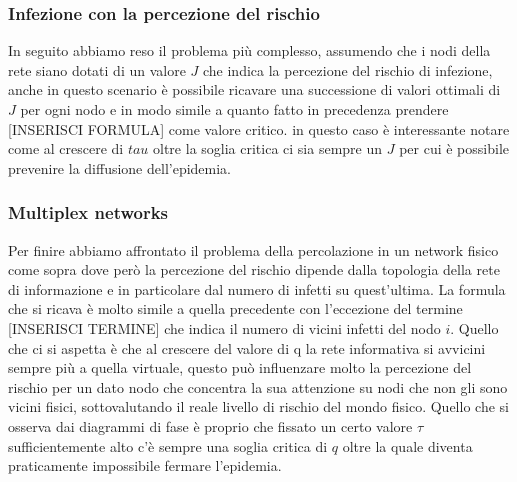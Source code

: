 \subsubsection{Infezione con la percezione del rischio}\label{subsubsec:infezione-con-la-percezione-del-rischio}
In seguito abbiamo reso il problema più complesso, assumendo che i nodi della rete siano dotati di 
un valore $J$ che indica la percezione del rischio di infezione, anche in questo scenario è possibile 
ricavare una successione di valori ottimali di $J$ per ogni nodo e in modo simile a quanto fatto in precedenza
prendere [INSERISCI FORMULA] come valore critico.
in questo caso è interessante notare come al crescere di $tau$ oltre la soglia critica ci sia sempre un 
$J$ per cui è possibile prevenire la diffusione dell'epidemia.
\subsubsection{Multiplex networks}\label{subsubsec:multiplex-networks}
Per finire abbiamo affrontato il problema della percolazione in un network fisico come sopra dove però la 
percezione del rischio dipende dalla topologia della rete di informazione e in particolare dal numero di
infetti su quest'ultima.
La formula che si ricava è molto simile a quella precedente con l'eccezione del termine [INSERISCI TERMINE]
che indica il numero di vicini infetti del nodo $i$. Quello che ci si aspetta è che al crescere del valore di q
la rete informativa si avvicini sempre più a quella virtuale, questo può influenzare molto la percezione 
del rischio per un dato nodo che concentra la sua attenzione su nodi che non gli sono vicini fisici, 
sottovalutando il reale livello di rischio del mondo fisico. Quello che si osserva dai diagrammi di fase è
proprio che fissato un certo valore $\tau$ sufficientemente alto c'è sempre una soglia critica di $q$ 
oltre la quale diventa praticamente impossibile fermare l'epidemia.